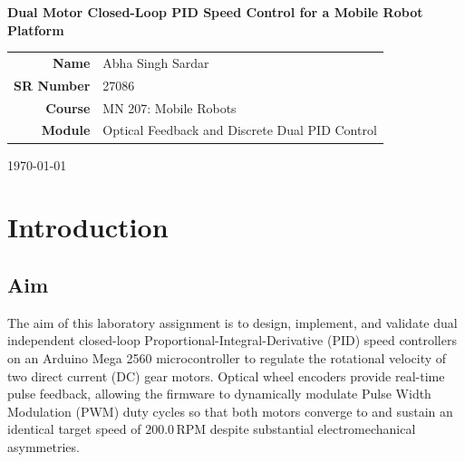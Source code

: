 \documentclass[11pt,a4paper]{article}
\begin{document}
\begin{titlepage}
\centering
\vspace*{2.5cm}
{\Huge\bfseries Dual Motor Closed-Loop PID Speed Control for a Mobile Robot Platform \par}
\vspace{2.2cm}
{\large
\begin{tabular}{rl}
\textbf{Name}      & Abha Singh Sardar  \\[6pt]
\textbf{SR Number} & 27086             \\[6pt]
\textbf{Course}    & MN 207: Mobile Robots \\[6pt]
\textbf{Module}    & Optical Feedback and Discrete Dual PID Control \\[6pt]
\end{tabular}\par}
\vspace{2.5cm}
{\large \today \par}
\vfill
\end{titlepage}

\newpage
{}

\section{Introduction}

\subsection{Aim}
The aim of this laboratory assignment is to design, implement, and validate dual independent closed-loop Proportional-Integral-Derivative (PID) speed controllers on an Arduino Mega 2560 microcontroller to regulate the rotational velocity of two direct current (DC) gear motors. Optical wheel encoders provide real-time pulse feedback, allowing the firmware to dynamically modulate Pulse Width Modulation (PWM) duty cycles so that both motors converge to and sustain an identical target speed of $200.0\,\text{RPM}$ despite substantial electromechanical asymmetries.
\end{document}

